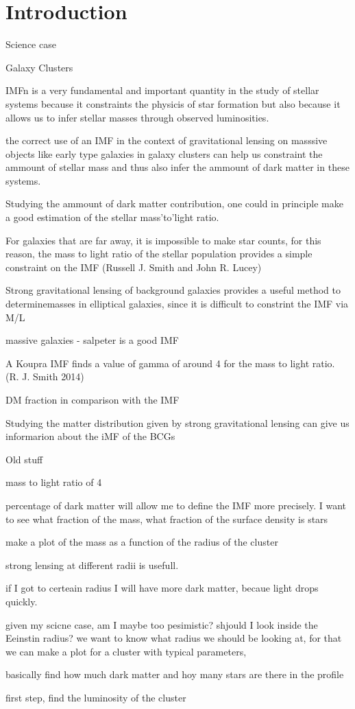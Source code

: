\chapter{Introduction}

Science case



Galaxy Clusters

IMFn is a very fundamental and important quantity in the study of stellar systems because it constraints the physicis of star formation but also because it allows us to infer stellar masses through observed luminosities.

the correct use of an IMF in the context of gravitational lensing on masssive objects like early type galaxies in galaxy clusters can help us constraint the ammount of stellar mass and thus also infer the ammount of dark matter in these systems.

Studying the ammount of dark matter contribution, one could in principle make a good estimation of the stellar mass'to'light ratio.

For galaxies that are far away, it is impossible to make star counts, for this reason, the mass to light ratio of the stellar population provides a simple constraint on the IMF (Russell J. Smith and John R. Lucey) 

Strong gravitational lensing of background galaxies provides a useful method to determinemasses in elliptical galaxies, since it is difficult to constrint the IMF via M/L

massive galaxies - salpeter is a good IMF

A Koupra IMF finds a value of gamma of around 4 for the mass to light ratio. (R. J. Smith 2014) 

DM fraction in comparison with the IMF 

Studying the matter distribution given by strong gravitational lensing can give us informarion about the iMF of the BCGs

Old stuff

mass to light ratio of 4

percentage of dark matter will allow me to define the IMF more precisely. I want to see what fraction of the mass, what fraction of the surface density is stars

make a plot of the mass as a function of the radius of the cluster 

strong lensing at different radii is usefull.

if I got to certeain radius I will have more dark matter, becaue light drops quickly. 

given my scicne case, am I maybe too pesimistic? shjould I look inside the Eeinstin radius? we want to know what radius we should be looking at, for that we can make a plot for a cluster with typical parameters, 

basically find how much dark matter and hoy many stars are there in the profile

first step, find the luminosity of the cluster





\newpage
